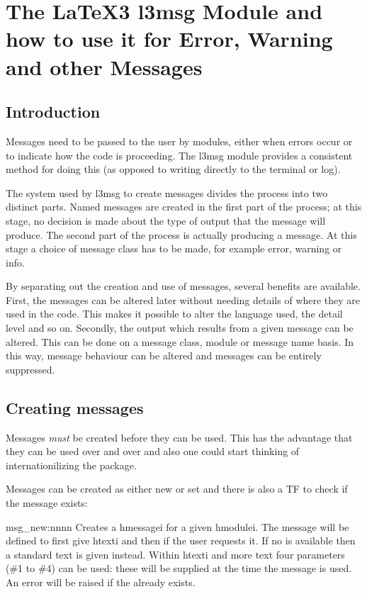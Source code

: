        
\chapter{The LaTeX3 l3msg Module and how to use it for Error, Warning and other Messages}
\section{Introduction}

Messages need to be passed to the user by modules, either when errors occur or to indicate
how the code is proceeding. The l3msg module provides a consistent method for doing
this (as opposed to writing directly to the terminal or log).

The system used by l3msg to create messages divides the process into two distinct
parts. Named messages are created in the first part of the process; at this stage, no
decision is made about the type of output that the message will produce. The second
part of the process is actually producing a message. At this stage a choice of message
class has to be made, for example error, warning or info.

By separating out the creation and use of messages, several benefits are available.
First, the messages can be altered later without needing details of where they are used
in the code. This makes it possible to alter the language used, the detail level and so
on. Secondly, the output which results from a given message can be altered. This can be
done on a message class, module or message name basis. In this way, message behaviour
can be altered and messages can be entirely suppressed.

\section{Creating messages}

Messages \emph{must} be created before they can be used. This has the advantage that they can be used
over and over and also one could start thinking of internationilizing the package.

Messages can be created as either new or set and there is also a TF to check if the message exists:

\begin{docCommand}{msg_new:nnnn}{     }
Creates a hmessagei for a given hmodulei. The message will be defined to first give htexti
and then  if the user requests it. If no  is available then a standard
text is given instead. Within htexti and more text four parameters (\#1 to \#4) can be
used: these will be supplied at the time the message is used. An error will be raised if
the  already exists.
\end{docCommand}


